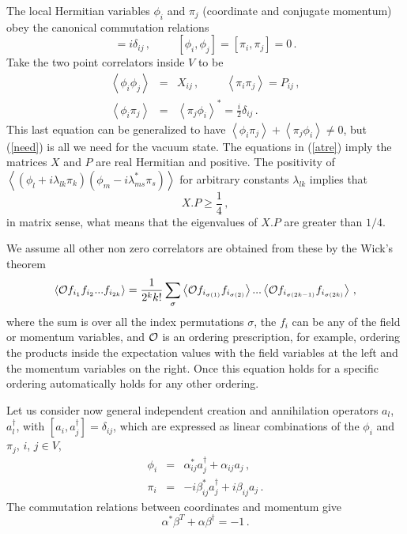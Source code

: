 \documentclass[a4paper]{article}
\begin{document}
The local Hermitian variables  $\phi _{i}$ and $\pi _{j}$ (coordinate and conjugate momentum) obey the canonical commutation relations 
\begin{equation}
[\phi _{i},\pi _{j}]=i\delta _{ij}\,,\hspace{1cm} [\phi _{i},\phi _{j}]=[\pi _{i},\pi _{j}]=0\,.
\end{equation} 
Take the two point correlators inside $V$ to be 
\begin{eqnarray}
\left\langle \phi _{i}\phi _{j}\right\rangle &=& X_{ij} \,, \hspace{1cm}\left\langle \pi _{i}\pi _{j}\right\rangle =P_{ij} \,, \label{atre}\\
 \left\langle \phi _{i}\pi _{j}\right\rangle &=& \left\langle \pi _{j}\phi _{i}\right\rangle^*=\frac{i}{2}\delta _{ij}\,.\label{need}
\end{eqnarray}
This last equation can be generalized to have $\left\langle \phi _{i}\pi _{j}\right\rangle + \left\langle \pi _{j}\phi _{i}\right\rangle\neq 0$, but (\ref{need}) is all we need for the vacuum state. 
The equations in (\ref{atre}) imply the matrices $X$ and $P$ are real Hermitian and positive. The positivity of $\left\langle (\phi _{l}+i \lambda_{lk} \pi_k )(\phi _{m}-i \lambda^*_{ms} \pi_s)\right\rangle $ for arbitrary constants $\lambda_{lk}$ implies that
\begin{equation}
X.P\ge \frac{1}{4}\label{popo}\,,
\end{equation} 
in matrix sense, what means that the eigenvalues of $X.P$ are greater than $1/4$. 

We assume all other non zero correlators are obtained from these by the Wick's   theorem 
\begin{equation}
\left<{\cal O} f_{i_1} f_{i_2}...f_{i_{2k}}\right>=\frac{1}{2^k k!}\sum_{\sigma}\left<{\cal O}f_{i_{\sigma(1)}} f_{i_{\sigma(2)}}\right>... \left<{\cal O} f_{i_{\sigma(2k-1)}} f_{i_{\sigma(2k)}}\right>\,,\label{quin}
\end{equation}
where the sum is over all the index permutations $\sigma$, the $f_i$ can be any of the field or momentum variables, and ${\cal O}$ is an ordering prescription, for example, ordering the products inside the expectation values with the field variables at the left and the momentum variables on the right. Once this equation holds for a specific ordering automatically holds for any other ordering.    
  
Let us consider now general independent creation and annihilation operators $a_{l}$, $a_l^\dagger$, 
with $
[a_{i},a_{j}^{\dagger }]=\delta _{ij}$, 
 which are 
expressed as linear combinations of the $\phi _{i}$ and $\pi _{j}$, $i$, $j\in V$,
\begin{eqnarray}
\phi_i&=&\alpha_{ij}^* a^\dagger_j+ \alpha_{ij} a_j\,,\label{sie}\\
\pi_i&=& -i \beta_{ij}^*  a^\dagger_j+ i \beta_{ij}  a_j\,.\label{oto} 
\end{eqnarray} 
The commutation relations between coordinates and momentum give 
\begin{equation}
\alpha^* \beta^T +\alpha \beta^\dagger =-1\,.
\end{equation}
\end{document}
